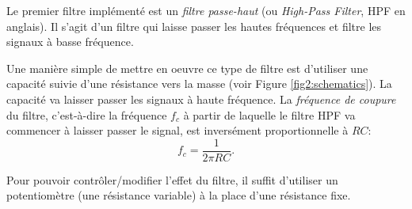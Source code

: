 Le premier filtre implémenté est un \emph{filtre passe-haut} (ou \emph{High-Pass Filter}, HPF en anglais). Il s'agit d'un filtre qui laisse passer les hautes fréquences et filtre les signaux à basse fréquence. 

Une manière simple de mettre en oeuvre ce type de filtre est d'utiliser une capacité suivie d'une résistance vers la masse (voir Figure \ref{fig2:schematics}). La capacité va laisser passer les signaux à haute fréquence. La \emph{fréquence de coupure} du filtre, c'est-à-dire la fréquence $f_c$ à partir de laquelle le filtre HPF va commencer à laisser passer le signal, est inversément proportionnelle à $RC$:
\[
	f_c = \dfrac{1}{2\pi RC}.
\]

Pour pouvoir contrôler/modifier l'effet du filtre, il suffit d'utiliser un potentiomètre (une résistance variable) à la place d'une résistance fixe.